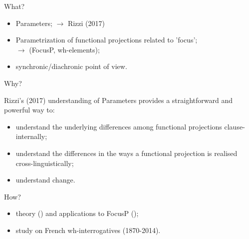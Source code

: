 \documentclass[lesson_slides]{subfiles}
\begin{document}
\begin{frame}[c]{What?}

    \begin{itemize}
        \item[\ding{227}] Parameters; \pause $\longrightarrow$ Rizzi (2017) \pause
        \item[\ding{227}] Parametrization of functional projections related to 'focus';\\ \pause
        $\longrightarrow$ (FocusP, wh-elements); \pause
        \item[\ding{227}] synchronic/diachronic point of view.
    \end{itemize}
    
\end{frame}
\begin{frame}[c]{Why?}

    Rizzi's (2017) understanding of Parameters provides a straightforward and powerful way to:
    \begin{itemize}
        \item[\ding{227}] understand the underlying differences among functional projections clause-internally; \pause 
        \item[\ding{227}] understand the differences in the ways a functional projection is realised cross-linguistically;
        \item[\ding{227}] understand change.
    \end{itemize}
  
\end{frame}
\begin{frame}[c]{How?}

    \begin{itemize}
        \item[\ding{227}] theory (\cite{rizzi1997fine}) and applications to FocusP (\cite{samo2019cartography}); \pause 
        \item[\ding{227}] study on French wh-interrogatives \pause (1870-2014).
    \end{itemize}
\end{frame}
\end{document}
